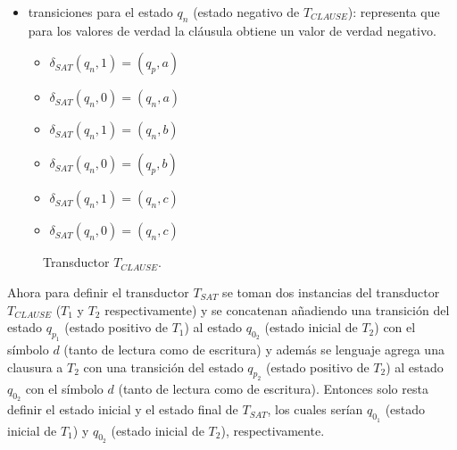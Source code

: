 \documentclass{article}
\begin{document}
\begin{itemize}
    \item  transiciones para el estado $q_n$ (estado negativo de $T_{CLAUSE}$): representa que para los valores de verdad la cláusula obtiene un valor de verdad negativo.
          \begin{multicols}{2}
              \begin{itemize}
                  \item $\delta_{SAT}(q_{n},1)=(q_{p},a)$
                  \item $\delta_{SAT}(q_{n},0)=(q_{n},a)$
                  \item $\delta_{SAT}(q_{n},1)=(q_{n},b)$
                  \item $\delta_{SAT}(q_{n},0)=(q_{p},b)$
                  \item $\delta_{SAT}(q_{n},1)=(q_{n},c)$
                  \item $\delta_{SAT}(q_{n},0)=(q_{n},c)$
              \end{itemize}
          \end{multicols}
\end{itemize}

\begin{figure}[h]
    \centering {}
    \caption{Transductor $T_{CLAUSE}$.}
    \label{fig:transducer} %
\end{figure}

Ahora para definir el transductor $T_{SAT}$ se toman dos instancias del transductor $T_{CLAUSE}$ ($T_1$ y $T_2$ respectivamente) y se concatenan
añadiendo una transición del estado $q_{p_1}$ (estado positivo de $T_1$) al estado $q_{0_2}$ (estado inicial de $T_2$) con el símbolo $d$ (tanto de
lectura como de escritura) y además se lenguaje agrega una clausura a $T_2$ con una transición del estado $q_{p_2}$
(estado positivo de $T_2$) al estado $q_{0_2}$ con el símbolo $d$ (tanto de lectura como de escritura). Entonces solo resta definir
el estado inicial y el estado final de $T_{SAT}$, los cuales serían $q_{0_1}$ (estado inicial de $T_1$) y $q_{0_2}$ (estado inicial de $T_2$),
respectivamente.
\end{document}
